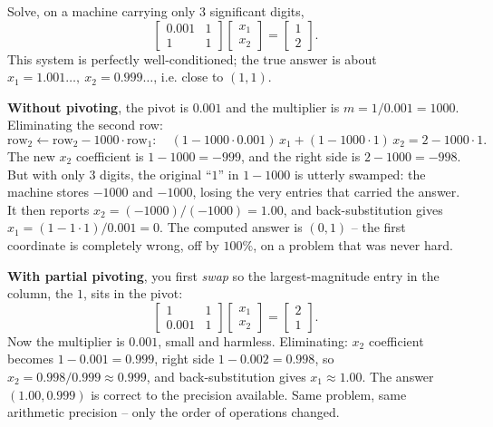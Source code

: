 \begin{example}
\label{ch33:pivot}
Solve, on a machine carrying only $3$ significant digits,
\[
  \begin{bmatrix} 0.001 & 1 \\ 1 & 1 \end{bmatrix}
  \begin{bmatrix} x_1 \\ x_2 \end{bmatrix} =
  \begin{bmatrix} 1 \\ 2 \end{bmatrix}.
\]
This system is perfectly well-conditioned; the true answer is about
$x_1 = 1.001\ldots,\ x_2 = 0.999\ldots$, i.e. close to $(1,1)$.

\textbf{Without pivoting}, the pivot is $0.001$ and the multiplier is
$m = 1/0.001 = 1000$. Eliminating the second row:
\[
  \text{row}_2 \leftarrow \text{row}_2 - 1000\cdot\text{row}_1:
  \quad (1 - 1000\cdot 0.001)\,x_1 + (1 - 1000\cdot 1)\,x_2 = 2 - 1000\cdot 1.
\]
The new $x_2$ coefficient is $1 - 1000 = -999$, and the right side is $2-1000=-998$.
But with only $3$ digits, the original ``$1$'' in $1-1000$ is utterly swamped: the
machine stores $-1000$ and $-1000$, losing the very entries that carried the answer.
It then reports $x_2 = (-1000)/(-1000) = 1.00$, and back-substitution gives
$x_1 = (1 - 1\cdot 1)/0.001 = 0$. The computed answer is $(0, 1)$ -- the first
coordinate is completely wrong, off by $100\%$, on a problem that was never hard.

\textbf{With partial pivoting}, you first \emph{swap} so the largest-magnitude entry in
the column, the $1$, sits in the pivot:
\[
  \begin{bmatrix} 1 & 1 \\ 0.001 & 1 \end{bmatrix}
  \begin{bmatrix} x_1 \\ x_2 \end{bmatrix} =
  \begin{bmatrix} 2 \\ 1 \end{bmatrix}.
\]
Now the multiplier is $0.001$, small and harmless. Eliminating:
$x_2$ coefficient becomes $1 - 0.001 = 0.999$, right side $1 - 0.002 = 0.998$, so
$x_2 = 0.998/0.999 \approx 0.999$, and back-substitution gives $x_1 \approx 1.00$. The
answer $(1.00, 0.999)$ is correct to the precision available. Same problem, same
arithmetic precision -- only the order of operations changed.
\end{example}

